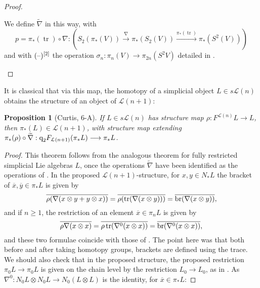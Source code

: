 \documentclass[11pt]{amsart}
\theoremstyle{plain}
\newtheorem{prop}[thm]{Proposition}
\theoremstyle{definition}
\DeclareMathOperator{\trace}{tr}
\newcommand{\DASH}{\textup{--}}
\renewcommand{\to}{\longrightarrow}
\newcommand{\calL}{\mathcal{L}}
\theoremstyle{plain}
\newcommand{\restn}[1]{#1^{[2]}}
\newcommand{\quadgrad}[1]{\textup{q}_{#1}}
\newcommand{\F}{\mathbb{F}}
\newcommand{\Ftwo}{\F_2}
\begin{document}
\begin{homotopy operations for PRLs}
\begin{proof}
\begin{shaded}
We define $\widetilde{\nabla}$ in this way, with
\[p=\pi_*(\trace)\circ\nabla:\left(S_2(\pi_*(V))\overset{\nabla}{\to}\pi_*(S_2(V))\overset{\pi_*(\trace)}{\to}\pi_*(S^2(V))\right)\]
and with $\restn{(\DASH)}$ the operation $\sigma_n:\pi_n(V)\to \pi_{2n}(S^2V)$ detailed in \cite[\S3]{MR1089001}.
\end{shaded}
%
\end{proof}
It is classical that via this map, the homotopy of a simplicial object $L\in s\calL(n)$ obtains the structure of an object of $\calL(n+1)$:
\begin{prop}[Curtis, 6-A]\label{prop on top operations}
If $L\in s\calL(n)$ has structure map $\rho:F^{\calL(n)}L\to L$, then $\pi_*(L)\in\calL(n+1)$, with structure map extending $\pi_*(\rho)\circ\widetilde{\nabla}:\quadgrad{2}F_{\calL(n+1)}(\pi_*L)\to \pi_*L$.
\end{prop}
\begin{proof}
This theorem follows from the analogous theorem for fully restricted simplicial Lie algebras $L$, once the operations $\widetilde{\nabla}$ have been identified as the operations of \cite[\S8.5]{CurtisSimplicialHtpy.pdf}. In the proposed $\calL(n+1)$-structure, for $x,y
\in N_*L$ the bracket of $\overline{x},\overline{y}\in\pi_*L$ is given by
\[\overline{\rho(\nabla(x\otimes y+y\otimes x))}=\overline{\rho(\trace(\nabla(x\otimes y)))}=\overline{\textup{br}(\nabla(x\otimes y))},\]
and if $n\geq1$, the restriction of an element $\overline{x}\in\pi_nL$ is given by
\[\overline{\rho\nabla(x\otimes x)}=\overline{\rho\trace(\nabla^0(x\otimes x))}=\overline{\textup{br}(\nabla^0(x\otimes x))},\]
and these two formulae coincide with those of \cite{CurtisSimplicialHtpy.pdf}. The point here was that both before and after taking homotopy groups, brackets are defined using the trace. We should also check that in the proposed structure, the proposed restriction $\pi_0L\to \pi_0L$ is given on the chain level by the restriction $L_0\to L_0$, as in \cite{CurtisSimplicialHtpy.pdf}. As $\nabla^0:N_0L\otimes N_0L\to N_0(L\otimes L)$ is the identity, for $\overline{x}\in\pi_*L$:

\end{proof}
\end{homotopy operations for PRLs}
\end{document}
